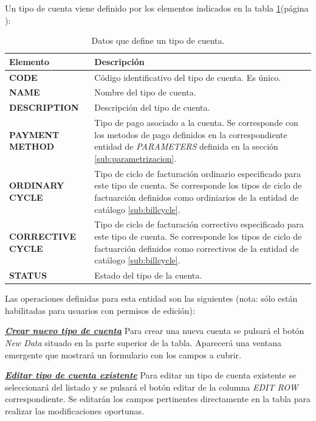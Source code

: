Un tipo de cuenta viene definido por los elementos indicados en la tabla \ref{tab:tipo-cuenta}(página \pageref{tab:tipo-cuenta}):



\begin{table}[H]
  \centering
  \setlength{\leftmargini}{0.4cm}
  \resizebox{14cm}{!} {
  \begin{tabular}{|m{3cm} m{11cm}|}
  \rowcolor{udcpink!25}
  \hline
  	\textbf{Elemento} & \textbf{Descripción} \\\hline
	\textbf{CODE} & Código identificativo del tipo de cuenta. Es único.   \\
	\textbf{NAME} & Nombre del tipo de cuenta. \\
	\textbf{DESCRIPTION} & Descripción del tipo de cuenta. \\	
	\textbf{PAYMENT METHOD} & Tipo de pago asociado a la cuenta. Se corresponde con los metodos de pago definidos en la correspondiente entidad de \emph{PARAMETERS} definida en la sección \ref{sub:parametrizacion}. \\	
	\textbf{ORDINARY CYCLE} & Tipo de ciclo de facturación ordinario especificado para este tipo de cuenta. Se corresponde los tipos de ciclo de factuarción definidos como ordiniarios de la entidad de catálogo \ref{sub:billcycle}. \\	 		\textbf{CORRECTIVE CYCLE} & Tipo de ciclo de facturación correctivo especificado para este tipo de cuenta. Se corresponde los tipos de ciclo de factuarción definidos como correctivos de la entidad de catálogo \ref{sub:billcycle}. \\	
	\textbf{STATUS} & Estado del tipo de la cuenta.
	\\\hline
  \end{tabular}
  } %
  \caption{Datos que define un tipo de cuenta.}
  \label{tab:tipo-cuenta}
\end{table}

Las operaciones definidas para esta entidad son las siguientes (nota: sólo están habilitadas para usuarios con permisos de edición):

\underline{\textsl{\textbf{Crear nuevo tipo de cuenta}}}\newline
Para crear una nueva cuenta se pulsará el botón \textit{New Data} situado en la parte superior de la tabla. Aparecerá una ventana emergente que mostrará un formulario con los campos a cubrir.

\underline{\textsl{\textbf{Editar tipo de cuenta existente}}}\newline
Para editar un tipo de cuenta existente se seleccionará del listado y se pulsará el botón editar de la columna \textit{EDIT ROW} correspondiente. Se editarán los campos pertinentes directamente en la tabla para realizar las modificaciones oportunas. 

